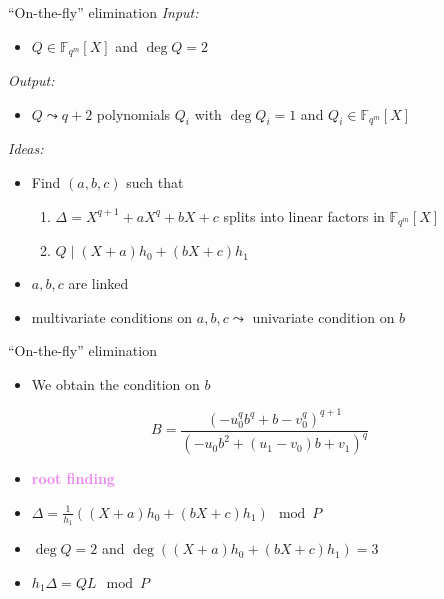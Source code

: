 \documentclass[xcolor=x11names,compress]{beamer}
\theoremstyle{break}
\theoremstyle{sc}
\theoremstyle{definition}
\theoremstyle{remark}
\begin{document}
\begin{frame}{``On-the-fly'' elimination}
  \emph{Input:}
  \begin{itemize}
    \item $Q\in \mathbb{F}_{q^m}[X]$ and $\deg Q = 2$
  \end{itemize}
  \emph{Output:}
  \begin{itemize}
    \item $Q\leadsto q+2$ polynomials $Q_i$ with $\deg Q_i = 1$ and $Q_i\in
      \mathbb{F}_{q^m}[X]$
  \end{itemize}

  \emph{Ideas:}
  \begin{itemize}
    \item Find $(a, b, c)$ such that
      \begin{enumerate}
        \item $\Delta = X^{q+1}+aX^q+bX+c$ splits into linear factors in $\mathbb{F}_{q^m}[X]$
        \item $Q\;|\; (X+a)h_0 + (bX+c)h_1$
      \end{enumerate}
    \item $a, b, c$ are linked
    \item multivariate conditions on $a, b, c\leadsto$ univariate condition
      on $b$
  \end{itemize}
\end{frame}

\begin{frame}{``On-the-fly'' elimination}
  \begin{itemize}
    \item We obtain the condition on $b$
  \end{itemize}
\[
  B = \frac{(-u_0^qb^q+b-v_0^q)^{q+1}}{(-u_0b^2+(u_1-v_0)b+v_1)^q}
\]
  \begin{itemize}
    \item \textcolor{violet}{\textbf{root finding}}
    \item $ \Delta = \frac{1}{h_1}((X+a)h_0 + (bX+c)h_1)\mod P $
    \item $\deg Q = 2$ and $\deg((X+a)h_0 + (bX+c)h_1)=3$
    \item $ h_1\Delta=QL \mod P$
  \end{itemize}
      
\end{frame}
\end{document}
